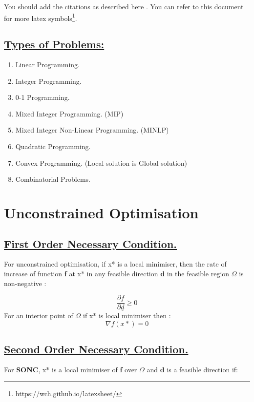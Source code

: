 \documentclass[12pt,a4paper,titlepage]{article}
\begin{document}
You should add the citations as described here \cite{sadd2009elasticity}. You can refer to this document for more latex symbols\footnote{https://wch.github.io/latexsheet/}.
%

\subsection{\underline{Types of Problems:}}
\begin{enumerate}
    \item Linear Programming.
    \item Integer Programming.
    \item 0-1 Programming.
    \item Mixed Integer Programming. (MIP)
    \item Mixed Integer Non-Linear Programming. (MINLP)
    \item Quadratic Programming.
    \item Convex Programming. (Local solution is Global solution)
    \item Combinatorial Problems.
\end{enumerate}
%

\section{Unconstrained Optimisation}

\subsection{\underline{First Order Necessary Condition.}}
For unconstrained optimisation, if x* is a local minimiser, then the rate of increase of function \textbf{f} at x* in any feasible direction \textbf{\underline{d}} in the feasible region $\Omega$ is non-negative :

\begin{equation}
    \dfrac{\partial f}{\partial\underline{d} } \geq 0 \label{eq1} 
\end{equation}
For an interior point of $\Omega$ if x* is local minimiser then :
\begin{equation}
    \nabla f (x*)=  0 \label{eq2} 
\end{equation}


\subsection{\underline{Second Order Necessary Condition.}}
For \textbf{SONC}, x* is a local minimiser of \textbf{f} over $\Omega$ and \textbf{\underline{d}} is a feasible direction if:
\end{document}

